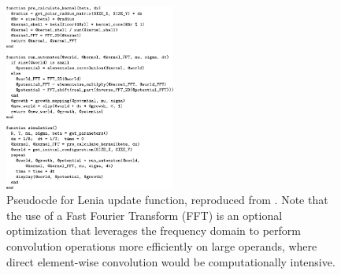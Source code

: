 \begin{figure}
\centering
\includegraphics[width=0.5\textwidth]{img/lenia-pseudocode}
\caption{Pseudocde for Lenia update function, reproduced from \citep{chan2019lenia}.
Note that the use of a Fast Fourier Transform (FFT) is an optional optimization that leverages the frequency domain to perform convolution operations more efficiently on large operands, where direct element-wise convolution would be computationally intensive.
}
\label{fig:lenia-pseudocode}
\end{figure}
